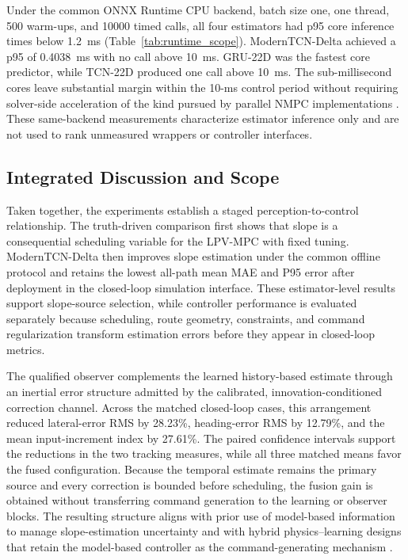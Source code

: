 \documentclass{ieeeaccess}
\newcommand{\citep}[1]{\cite{#1}}
\begin{document}
Under the common ONNX Runtime CPU backend, batch size one, one thread, 500 warm-ups, and 10000 timed calls, all four estimators had p95 core inference times below 1.2~ms (Table~\ref{tab:runtime_scope}). ModernTCN-Delta achieved a p95 of 0.4038~ms with no call above 10~ms. GRU-22D was the fastest core predictor, while TCN-22D produced one call above 10~ms. The sub-millisecond cores leave substantial margin within the 10-ms control period without requiring solver-side acceleration of the kind pursued by parallel NMPC implementations \citep{Xu2024ParallelNMPC}. These same-backend measurements characterize estimator inference only and are not used to rank unmeasured wrappers or controller interfaces.

\subsection{Integrated Discussion and Scope}
\label{subsec:integrated_discussion_scope}

Taken together, the experiments establish a staged perception-to-control relationship. The truth-driven comparison first shows that slope is a consequential scheduling variable for the LPV-MPC with fixed tuning. ModernTCN-Delta then improves slope estimation under the common offline protocol and retains the lowest all-path mean MAE and P95 error after deployment in the closed-loop simulation interface. These estimator-level results support slope-source selection, while controller performance is evaluated separately because scheduling, route geometry, constraints, and command regularization transform estimation errors before they appear in closed-loop metrics.

The qualified observer complements the learned history-based estimate through
an inertial error structure admitted by the calibrated,
innovation-conditioned correction channel. Across the matched closed-loop
cases, this arrangement reduced lateral-error RMS by 28.23\%, heading-error
RMS by 12.79\%, and the mean input-increment index by 27.61\%. The paired
confidence intervals support the reductions in the two tracking measures,
while all three matched means favor the fused configuration. Because the
temporal estimate remains the primary source and every correction
is bounded before scheduling, the fusion gain is obtained without transferring
command generation to the learning or observer blocks. The resulting structure aligns
with prior use of model-based information to manage slope-estimation
uncertainty \citep{Liu2023RoadSlopeAAIMM,Gao2024RoadSlopeHDV,Feng2021MultiModelFusion} and with hybrid
physics--learning designs that retain the model-based controller as the
command-generating mechanism \citep{Zheng2024HybridPhysicsLearningUSV}.
\end{document}
